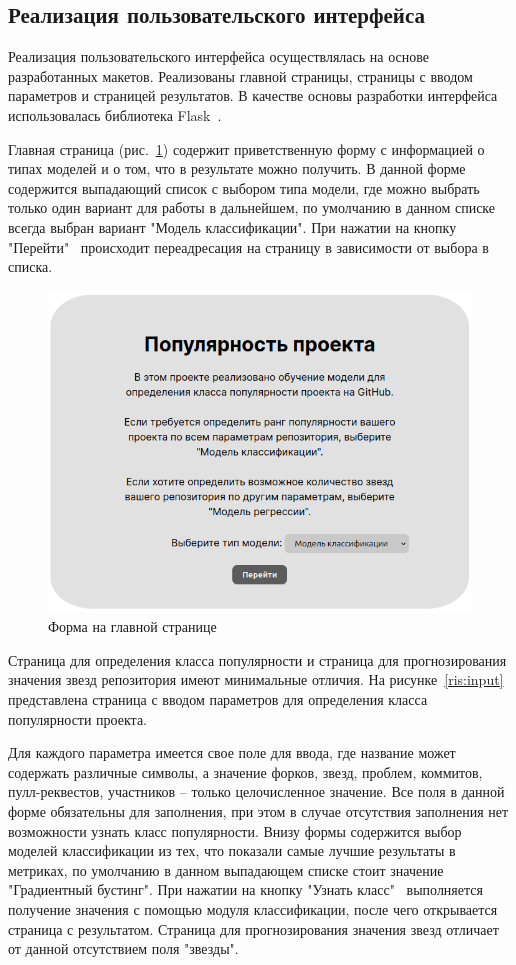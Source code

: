 \subsection{Реализация пользовательского интерфейса}

Реализация пользовательского интерфейса осуществлялась на основе разработанных макетов. Реализованы главной страницы, страницы с вводом параметров и страницей результатов. В качестве основы разработки интерфейса использовалась библиотека Flask~\cite{flask}.

Главная страница (рис.~\ref{ris:main}) содержит приветственную форму с информацией о типах моделей и о том, что в результате можно получить. В данной форме содержится выпадающий список с выбором типа модели, где можно выбрать только один вариант для работы в дальнейшем, по умолчанию в данном списке всегда выбран вариант "Модель классификации". При нажатии на кнопку "Перейти" \ происходит переадресация на страницу в зависимости от выбора в списка.

\begin{figure}[h]
    \centering
    \includegraphics[width=0.9\linewidth]{pic/main.png}
    \vspace{0.5em}    \caption{Форма на главной странице}
    \label{ris:main}
\end{figure}
\vspace{1em}

Страница для определения класса популярности и страница для прогнозирования значения звезд репозитория имеют минимальные отличия. На рисунке~\ref{ris:input} представлена страница с вводом параметров для определения класса популярности проекта. 

Для каждого параметра имеется свое поле для ввода, где название может содержать различные символы, а значение форков, звезд, проблем, коммитов, пулл-реквестов, участников -- только целочисленное значение. Все поля в данной форме обязательны для заполнения, при этом в случае отсутствия заполнения нет возможности узнать класс популярности. Внизу формы содержится выбор моделей классификации из тех, что показали самые лучшие результаты в метриках, по умолчанию в данном выпадающем списке стоит значение "Градиентный бустинг". При нажатии на кнопку "Узнать класс" \ выполняется получение значения с помощью модуля классификации, после чего открывается страница с результатом. Страница для прогнозирования значения звезд отличает от данной отсутствием поля "звезды".

